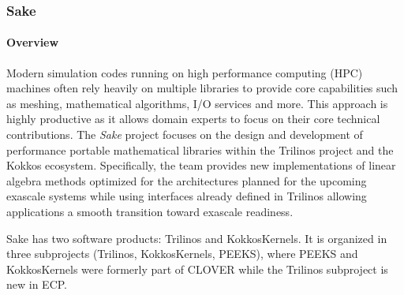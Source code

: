 \subsubsection{ Sake} \label{subsubsect:sake}

\paragraph{Overview} 

Modern simulation codes running on high performance computing (HPC) machines often rely heavily on multiple libraries to provide core capabilities such as 
meshing, mathematical algorithms, I/O services and more. This approach is highly productive as it allows domain experts to focus on their core technical 
contributions. The \emph{Sake} project focuses on the design and development of performance portable mathematical libraries within the Trilinos project and the 
Kokkos ecosystem. Specifically, the team provides new implementations of linear algebra methods optimized for the architectures planned for the upcoming exascale 
systems while using interfaces already defined in Trilinos allowing applications a smooth transition toward exascale readiness.

Sake has two software products: Trilinos and KokkosKernels. It is organized in three subprojects (Trilinos, KokkosKernels, PEEKS), where 
PEEKS and KokkosKernels were formerly part of CLOVER while the Trilinos subproject is new in ECP.
